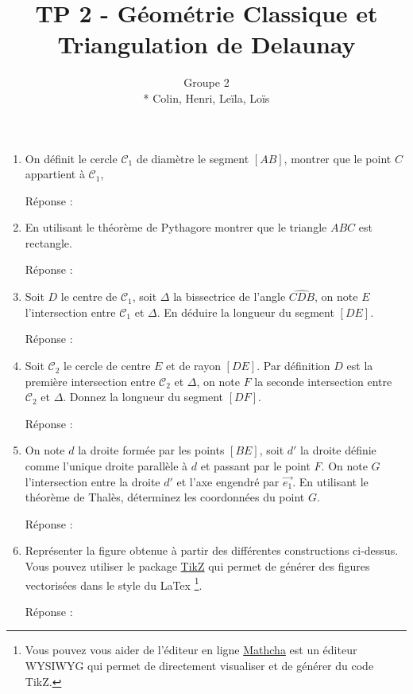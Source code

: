 \documentclass[a4paper,12pt]{article}
\title{TP 2 - Géométrie Classique et Triangulation de Delaunay}
\author{Groupe 2 \\* Colin, Henri, Leïla, Loïs}
\begin{document}
\maketitle



\begin{enumerate}
   \item On définit le cercle $\mathcal{C}_1$ de diamètre le segment $[AB]$, montrer que le point $C$ appartient à $\mathcal{C}_1$, 

Réponse :
\newline
   \item En utilisant le théorème de Pythagore montrer que le triangle $ABC$ est rectangle. 

  Réponse :
\newline
   \item Soit $D$ le centre de $\mathcal{C}_1$, soit $\Delta$ la bissectrice de l'angle $\widehat{CDB}$, on note $E$ l'intersection entre $\mathcal{C}_1$ et $\Delta$. En déduire la longueur du segment $[DE]$. 

Réponse :
\newline
   \item Soit $\mathcal{C}_2$ le cercle de centre $E$ et de rayon $[DE]$. Par définition $D$ est la première intersection entre $\mathcal{C}_2$ et $\Delta$, on note $F$ la seconde intersection entre $\mathcal{C}_2$ et $\Delta$. Donnez la longueur du segment $[DF]$. 

Réponse :
\newline
   \item On note $d$ la droite formée par les points $[BE]$, soit $d'$ la droite définie comme l'unique droite parallèle à $d$ et passant par le point $F$. On note $G$ l'intersection entre la droite $d'$ et l'axe engendré par $\vec{e_1}$. En utilisant le théorème de Thalès, déterminez les coordonnées du point $G$. 

  Réponse :
\newline
   \item Représenter la figure obtenue à partir des différentes constructions ci-dessus. Vous pouvez utiliser le package \href{https://www.overleaf.com/learn/latex/TikZ_package}{TikZ} qui permet de générer des figures vectorisées dans le style du LaTex
\footnote{Vous pouvez vous aider de l'éditeur en ligne \href{https://www.mathcha.io/}{Mathcha} est un éditeur WYSIWYG qui permet de directement visualiser et de générer du code TikZ.}.  

Réponse :
\newline
\end{enumerate}
\end{document}
